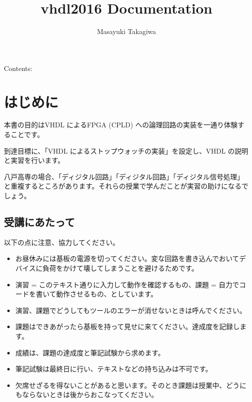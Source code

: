 \documentclass[letterpaper,10pt,dvipdfmx]{sphinxmanual}
\title{vhdl2016 Documentation}
\date{}
\author{Masayuki Takagiwa}
\begin{document}
\maketitle
\tableofcontents
{}\label{index::doc}


Contents:


\chapter{はじめに}
\label{01_introduction:id1}\label{01_introduction::doc}
本書の目的はVHDL によるFPGA (CPLD) への論理回路の実装を一通り体験することです。

到達目標に、「VHDL によるストップウォッチの実装」を設定し、VHDL の説明と実習を行います。

八戸高専の場合、「ディジタル回路」「ディジタル回路」「ディジタル信号処理」と重複するところがあります。それらの授業で学んだことが実習の助けになるでしょう。


\section{受講にあたって}
\label{01_introduction:id2}
以下の点に注意、協力してください。
\begin{itemize}
\item {} 
お昼休みには基板の電源を切ってください。変な回路を書き込んでおいてデバイスに負荷をかけて壊してしまうことを避けるためです。

\item {} 
演習 = このテキスト通りに入力して動作を確認するもの、課題 = 自力でコードを書いて動作させるもの、としています。

\item {} 
演習、課題でどうしてもツールのエラーが消せないときは呼んでください。

\item {} 
課題はできあがったら基板を持って見せに来てください。達成度を記録します。

\item {} 
成績は、課題の達成度と筆記試験から求めます。

\item {} 
筆記試験は最終日に行い、テキストなどの持ち込みは不可です。

\item {} 
欠席せざるを得ないことがあると思います。そのとき課題は授業中、どうにもならないときは後からおこなってください。

\end{itemize}
\end{document}
